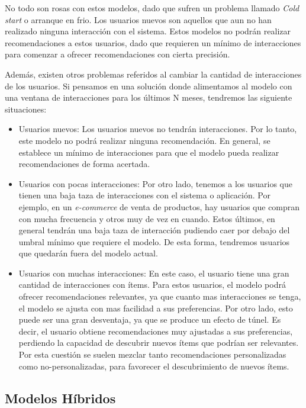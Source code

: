 \documentclass[11pt,a4paper,twoside]{thesis}
\begin{document}
No todo son rosas con estos modelos, dado que sufren un problema llamado
\textit{Cold start} o arranque en frio. Los usuarios nuevos son aquellos que
aun no han realizado ninguna interacción con el sistema. Estos modelos no
podrán realizar recomendaciones a estos usuarios, dado que requieren un mínimo
de interacciones para comenzar a ofrecer recomendaciones con cierta precisión.

Además, existen otros problemas referidos al cambiar la cantidad de
interacciones de los usuarios. Si pensamos en una solución donde alimentamos al
modelo con una ventana de interacciones para los últimos N meses, tendremos las
siguiente situaciones:

\begin{itemize}
	\item Usuarios nuevos: Los usuarios nuevos no tendrán interacciones. Por lo tanto,
	      este modelo no podrá realizar ninguna recomendación. En general, se establece
	      un mínimo de interacciones para que el modelo pueda realizar recomendaciones de
	      forma acertada.
	\item Usuarios con pocas interacciones: Por otro lado, tenemos a los usuarios que
	      tienen una baja taza de interacciones con el sistema o aplicación. Por ejemplo,
	      en un \textit{e-commerce} de venta de productos, hay usuarios que compran con
	      mucha frecuencia y otros muy de vez en cuando. Estos últimos, en general
	      tendrán una baja taza de interacción pudiendo caer por debajo del umbral mínimo
	      que requiere el modelo. De esta forma, tendremos usuarios que quedarán fuera
	      del modelo actual.
	\item Usuarios con muchas interacciones: En este caso, el usuario tiene una gran
	      cantidad de interacciones con ítems. Para estos usuarios, el modelo podrá
	      ofrecer recomendaciones relevantes, ya que cuanto mas interacciones se tenga,
	      el modelo se ajusta con mas facilidad a sus preferencias. Por otro lado, esto
	      puede ser una gran desventaja, ya que se produce un efecto de túnel. Es decir,
	      el usuario obtiene recomendaciones muy ajustadas a sus preferencias, perdiendo
	      la capacidad de descubrir nuevos ítems que podrían ser relevantes. Por esta
	      cuestión se suelen mezclar tanto recomendaciones personalizadas como
	      no-personalizadas, para favorecer el descubrimiento de nuevos ítems.

\end{itemize}

\clearpage
\subsection{Modelos Híbridos}
\end{document}
